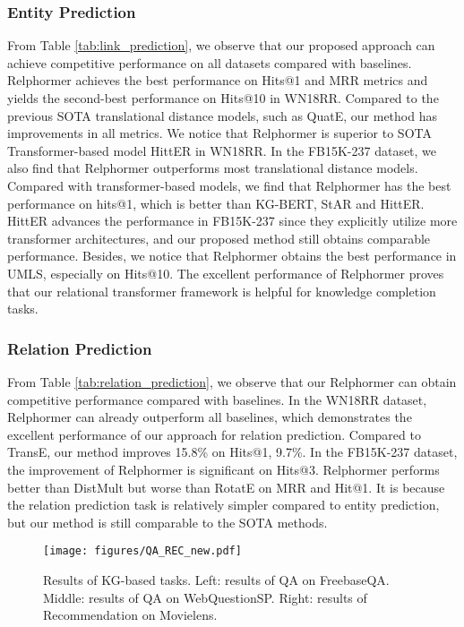 \documentclass[sigconf]{acmart}
\newcommand{\bizhen}[1]{{\color{black}#1}}
\begin{document}
        \subsubsection{\textbf{Entity Prediction}}
        From Table \ref{tab:link_prediction}, we observe that our proposed approach can achieve competitive performance on all datasets compared with baselines.
        Relphormer achieves the best performance on Hits@1 and MRR metrics and yields the second-best performance on Hits@10 in WN18RR. 
        Compared to the previous SOTA translational distance models, such as QuatE, our method has improvements in all metrics.
        We notice that Relphormer is superior to SOTA Transformer-based model HittER in WN18RR.
        In the FB15K-237 dataset, we also find that Relphormer outperforms most translational distance models.
        Compared with transformer-based models, we find that Relphormer has the best performance on hits@1, which is better than KG-BERT, StAR and HittER.
        HittER advances the performance in FB15K-237 since they explicitly utilize more transformer architectures, and our proposed method still obtains comparable performance.
        Besides, we notice that Relphormer obtains the best performance in UMLS, especially on Hits@10.
        The excellent performance of Relphormer proves that our relational transformer framework is helpful for knowledge completion tasks.


    \subsubsection{\textbf{Relation Prediction}}
        From Table \ref{tab:relation_prediction}, we observe that our Relphormer can obtain competitive performance compared with  baselines.
        In the WN18RR dataset, Relphormer can already outperform all baselines, which demonstrates the excellent performance of our approach for relation prediction.
        Compared to TransE, our method improves 15.8\% on Hits@1, 9.7\%.
        In the FB15K-237 dataset, the improvement of Relphormer is significant on Hits@3.
        Relphormer performs better than DistMult but worse than RotatE {on MRR and Hit@1}.
        {
        It is because the relation prediction task is relatively simpler compared to entity prediction, but our method is still comparable to the SOTA methods.    
        }


\begin{figure*}
    \centering
    \texttt{[image: figures/QA\_REC\_new.pdf]}
        \caption{
    \bizhen{Results of KG-based tasks.
    Left: results of QA on {FreebaseQA}.
    Middle: results of QA on WebQuestionSP.
    Right: results of Recommendation on Movielens.
    }
    }
    \label{fig:qa_rec}
\end{figure*}
\end{document}
